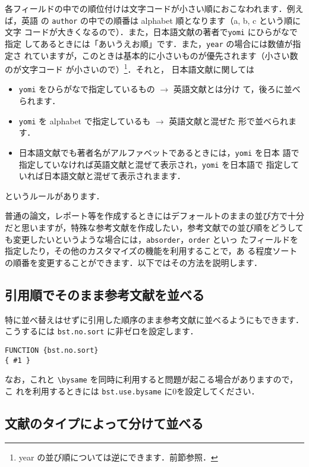 \documentclass[a4j,10pt]{jarticle}
\begin{document}
各フィールドの中での順位付けは文字コードが小さい順におこなわれます．例えば，英語
の \texttt{author} の中での順番は alphabet 順となります（a, b, c という順に文字
コードが大きくなるので）．また，日本語文献の著者で\texttt{yomi} にひらがなで指定
してあるときには「あいうえお順」です．また，\texttt{year} の場合には数値が指定さ
れていますが，このときは基本的に小さいものが優先されます（小さい数のが文字コード
が小さいので）\footnote{year の並び順については逆にできます．前節参照．}．それと，
日本語文献に関しては
\begin{itemize}
 \item \texttt{yomi} をひらがなで指定しているもの $\rightarrow$ 英語文献とは分け
       て，後ろに並べられます．
 \item \texttt{yomi} を alphabet で指定しているも $\rightarrow$ 英語文献と混ぜた
       形で並べられます．
 \item 日本語文献でも著者名がアルファベットであるときには，\texttt{yomi} を日本
       語で指定していなければ英語文献と混ぜて表示され，\texttt{yomi} を日本語で
       指定していれば日本語文献と混ぜて表示されまます．
\end{itemize}
というルールがあります．

普通の論文，レポート等を作成するときにはデフォールトのままの並び方で十分
だと思いますが，特殊な参考文献を作成したい，参考文献での並び順をどうして
も変更したいというような場合には，\texttt{absorder}，\texttt{order} といっ
たフィールドを指定したり，その他のカスタマイズの機能を利用することで，あ
る程度ソートの順番を変更することができます．以下ではその方法を説明します．

\subsection{引用順でそのまま参考文献を並べる}

特に並べ替えはせずに引用した順序のまま参考文献に並べるようにもできます．
こうするには \texttt{bst.no.sort} に非ゼロを設定します．
\begin{screen}
\begin{verbatim}
FUNCTION {bst.no.sort}
{ #1 }
\end{verbatim}
\end{screen}

なお，これと \verb|\bysame| を同時に利用すると問題が起こる場合がありますので，こ
れを利用するときには \texttt{bst.use.bysame} に0を設定してください．

\subsection{文献のタイプによって分けて並べる}
\end{document}
